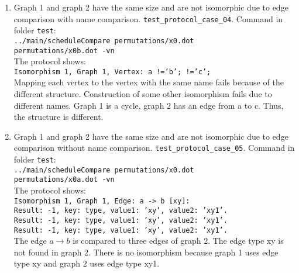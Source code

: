 \documentclass[12pt,a4paper]{report}
\begin{document}
\begin{enumerate}
  \item Graph 1 and graph 2 have the same size and are not isomorphic due to edge comparison with name comparison.
    \texttt{test\_protocol\_case\_04}. Command in folder \texttt{test}: \\
    \texttt{../main/scheduleCompare permutations/x0.dot \\ permutations/x0b.dot -vn} \\
    The protocol shows: \\
    \texttt{Isomorphism 1, Graph 1, Vertex: a !='b'; !='c';} \\
    Mapping each vertex to the vertex with the same name fails because of the different structure.
    Construction of some other isomorphism fails due to different names.
    Graph 1 is a cycle, graph 2 has an edge from a to c. Thus, the structure is different.
  \item Graph 1 and graph 2 have the same size and are not isomorphic due to edge comparison without name comparison.
    \texttt{test\_protocol\_case\_05}. Command in folder \texttt{test}: \\
    \texttt{../main/scheduleCompare permutations/x0.dot \\ permutations/x0a.dot -vn} \\
    The protocol shows: \\
    \texttt{Isomorphism 1, Graph 1, Edge: a -> b [xy]: \\ 
        Result: -1, key: type, value1: 'xy', value2: 'xy1'. \\
        Result: -1, key: type, value1: 'xy', value2: 'xy1'. \\ 
        Result: -1, key: type, value1: 'xy', value2: 'xy1'.} \\
    The edge $a \rightarrow b$ is compared to three edges of graph 2. The edge type xy is not found in graph 2.
    There is no isomorphism because graph 1 uses edge type xy and graph 2 uses edge type xy1.


\end{enumerate}
\end{document}
